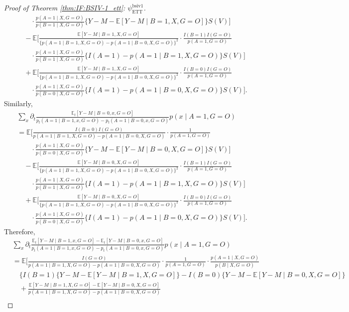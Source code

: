 \documentclass[10pt]{article}
\newcommand{\E}{\mathbb{E}}
\begin{document}
\begin{proof}[Proof of Theorem \ref{thm:IF:BSIV-1_ett}: $\psi_{\text{ETT}}^{\text{bsiv1}}$]
\begin{align*}
&\qquad\cdot\frac{p(A=1\mid X,G=O)}{p(B=1\mid X,G=O)}\{Y-M-\E[Y-M\mid B=1,X,G=O]\}S(V)\big]\\
&\quad-\E\big[\frac{\E[Y-M\mid B=1,X,G=O]}{\{p(A=1\mid B=1,X,G=O)-p(A=1\mid B=0,X,G=O)\}^2}\cdot\frac{I(B=1)I(G=O)}{p(A=1,G=O)}\\
&\qquad\cdot \frac{p(A=1\mid X,G=O)}{p(B=1\mid X,G=O)}\{I(A=1)-p(A=1\mid B=1,X,G=O)\} S(V)\big]\\
&\quad+\E\big[\frac{\E[Y-M\mid B=1,X,G=O]}{\{p(A=1\mid B=1,X,G=O)-p(A=1\mid B=0,X,G=O)\}^2}\cdot\frac{I(B=0)I(G=O)}{p(A=1,G=O)}\\
&\qquad\cdot \frac{p(A=1\mid X,G=O)}{p(B=0\mid X,G=O)}\{I(A=1)-p(A=1\mid B=0,X,G=O)\} S(V)\big].
\end{align*}
\endgroup
Similarly,
\begingroup
\allowdisplaybreaks
\begin{align*}
&\sum_x\partial_t\frac{\E_t[Y-M\mid B=0,x,G=O]}{p_t(A=1\mid B=1,x,G=O)-p_t(A=1\mid B=0,x,G=O)}p(x\mid A=1,G=O)\\
&=\E\big[\frac{I(B=0)I(G=O)}{p(A=1\mid B=1,X,G=O)-p(A=1\mid B=0,X,G=O)}\cdot\frac{1}{p(A=1,G=O)}\\
&\qquad\cdot\frac{p(A=1\mid X,G=O)}{p(B=0\mid X,G=O)}\{Y-M-\E[Y-M\mid B=0,X,G=O]\}S(V)\big]\\
&\quad-\E\big[\frac{\E[Y-M\mid B=0,X,G=O]}{\{p(A=1\mid B=1,X,G=O)-p(A=1\mid B=0,X,G=O)\}^2}\cdot\frac{I(B=1)I(G=O)}{p(A=1,G=O)}\\
&\qquad\cdot \frac{p(A=1\mid X,G=O)}{p(B=1\mid X,G=O)}\{I(A=1)-p(A=1\mid B=1,X,G=O)\} S(V)\big]\\
&\quad+\E\big[\frac{\E[Y-M\mid B=0,X,G=O]}{\{p(A=1\mid B=1,X,G=O)-p(A=1\mid B=0,X,G=O)\}^2}\cdot\frac{I(B=0)I(G=O)}{p(A=1,G=O)}\\
&\qquad\cdot \frac{p(A=1\mid X,G=O)}{p(B=0\mid X,G=O)}\{I(A=1)-p(A=1\mid B=0,X,G=O)\} S(V)\big].
\end{align*}
\endgroup
Therefore,
\begingroup
\allowdisplaybreaks
{\footnotesize \begin{align*}
&\sum_x\partial_t\frac{\E_t[Y-M\mid B=1,x,G=O]-\E_t[Y-M\mid B=0,x,G=O]}{p_t(A=1\mid B=1,x,G=O)-p_t(A=1\mid B=0,x,G=O)}p(x\mid A=1,G=O)\\
&=\E\Big[\frac{I(G=O)}{p(A=1\mid B=1,X,G=O)-p(A=1\mid B=0,X,G=O)}\cdot\frac{1}{p(A=1,G=O)}
\cdot\frac{p(A=1\mid X,G=O)}{p(B\mid X,G=O)}\\
&\quad\Big\{I(B=1)\{Y-M-\E[Y-M\mid B=1,X,G=O]\}
-I(B=0)\{Y-M-\E[Y-M\mid B=0,X,G=O]\}\\
&\quad+\frac{\E[Y-M\mid B=1,X,G=O]-\E[Y-M\mid B=0,X,G=O]}{p(A=1\mid B=1,X,G=O)-p(A=1\mid B=0,X,G=O)}\\

\end{align*}}
\end{proof}
\end{document}
